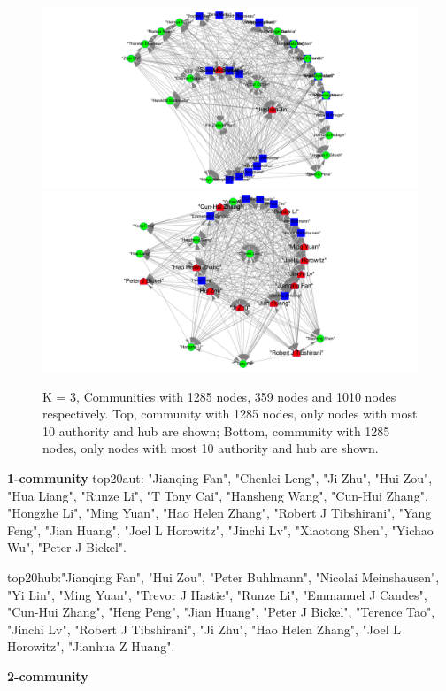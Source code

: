 \documentclass{article}
\numberwithin{equation}{section}
\begin{document}
\begin{figure}[H] \label{fig:kmeans}
	\centering
	\includegraphics[width=\textwidth]{Dscore/dsocre-1-ah.png}
	\includegraphics[width=\textwidth]{Dscore/dsocre-2-ah.png}
	\caption{K = 3, Communities with 1285 nodes, 359 nodes and 1010 nodes respectively. Top, community with 1285 nodes, only nodes with most 10 authority and hub are shown; Bottom, community with 1285 nodes, only nodes with most 10 authority and hub are shown.}
\end{figure}

\textbf{1-community}
top20aut: "Jianqing Fan", "Chenlei Leng", "Ji Zhu", "Hui Zou", "Hua Liang", "Runze Li", "T Tony Cai", "Hansheng Wang", "Cun-Hui Zhang", "Hongzhe Li", "Ming Yuan", "Hao Helen Zhang", "Robert J Tibshirani", "Yang Feng", "Jian Huang", "Joel L Horowitz", "Jinchi Lv", "Xiaotong Shen", "Yichao Wu", "Peter J Bickel".

top20hub:"Jianqing Fan", "Hui Zou", "Peter Buhlmann", "Nicolai Meinshausen", "Yi Lin", "Ming Yuan", "Trevor J Hastie", "Runze Li", "Emmanuel J Candes", "Cun-Hui Zhang", "Heng Peng", "Jian Huang", "Peter J Bickel", "Terence Tao", "Jinchi Lv", "Robert J Tibshirani", "Ji Zhu", "Hao Helen Zhang", "Joel L Horowitz", "Jianhua Z Huang".

\textbf{2-community}
\end{document}
